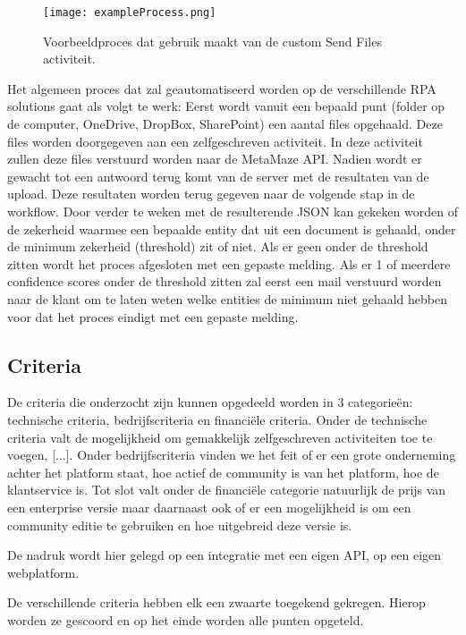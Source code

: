 \begin{figure}[h]
	\texttt{[image: exampleProcess.png]}
	\caption{Voorbeeldproces dat gebruik maakt van de custom Send Files activiteit.}
\end{figure}

Het algemeen proces dat zal geautomatiseerd worden op de verschillende RPA solutions gaat als volgt te werk: Eerst wordt vanuit een bepaald punt (folder op de computer, OneDrive, DropBox, SharePoint) een aantal files opgehaald. Deze files worden doorgegeven aan een zelfgeschreven activiteit. In deze activiteit zullen deze files verstuurd worden naar de MetaMaze API. Nadien wordt er gewacht tot een antwoord terug komt van de server met de resultaten van de upload. Deze resultaten worden terug gegeven naar de volgende stap in de workflow. Door verder te weken met de resulterende JSON kan gekeken worden of de zekerheid waarmee een bepaalde entity dat uit een document is gehaald, onder de minimum zekerheid (threshold) zit of niet. Als er geen onder de threshold zitten wordt het proces afgesloten met een gepaste melding. Als er 1 of meerdere confidence scores onder de threshold zitten zal eerst een mail verstuurd worden naar de klant om te laten weten welke entities de minimum niet gehaald hebben voor dat het proces eindigt met een gepaste melding.

\subsection{Criteria}
De criteria die onderzocht zijn kunnen opgedeeld worden in 3 categorieën: technische criteria, bedrijfscriteria en financiële criteria. Onder de technische criteria valt de mogelijkheid om gemakkelijk zelfgeschreven activiteiten toe te voegen, [...]. Onder bedrijfscriteria vinden we het feit of er een grote onderneming achter het platform staat, hoe actief de community is van het platform, hoe de klantservice is. Tot slot valt onder de financiële categorie natuurlijk de prijs van een enterprise versie maar daarnaast ook of er een mogelijkheid is om een community editie te gebruiken en hoe uitgebreid deze versie is.

De nadruk wordt hier gelegd op een integratie met een eigen API, op een eigen webplatform.

De verschillende criteria hebben elk een zwaarte toegekend gekregen. Hierop worden ze gescoord en op het einde worden alle punten opgeteld.

